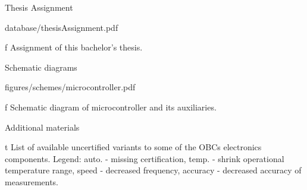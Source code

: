 

\app Thesis Assignment

\midinsert
    \hsize \cinspic database/thesisAssignment.pdf
    \caption/f Assignment of this bachelor's thesis.
\endinsert



\app Schematic diagrams

\midinsert
    \hsize \cinspic figures/schemes/microcontroller.pdf
    \caption/f Schematic diagram of microcontroller and its auxiliaries.
\endinsert



\app Additional materials

\midinsert {}
    \caption/t List of available uncertified variants to some of the OBCs electronics components. Legend: auto. - missing  certification, temp. - shrink operational temperature range, speed - decreased frequency, accuracy - decreased accuracy of measurements.
\endinsert